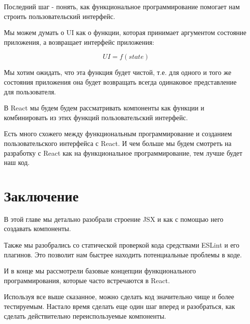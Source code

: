 Последний шаг - понять, как функциональное программирование помогает нам строить пользовательский интерфейс. 

Мы можем думать о UI как о функции, которая принимает аргументом состояние приложения, а возвращает интерфейс приложения:

$$
UI = f(state)
$$

Мы хотим ожидать, что эта функция будет чистой, т.е. для одного и того же состояния приложения она будет возвращать всегда одинаковое представление для пользователя.

В React мы будем будем рассматривать компоненты как функции и комбинировать из этих функций пользовательский интерфейс.

Есть много схожего между функциональным программирование и созданием пользовательского интерфейса с React. И чем больше мы будем смотреть на разработку с React как на функциональное программирование, тем лучше будет наш код.

\section{Заключение}

В этой главе мы детально разобрали строение JSX и как с помощью него создавать компоненты. 

Также мы разобрались со статической проверкой кода средствами ESLint и его плагинов. Это позволит нам быстрее находить потенциальные проблемы в коде.

И в конце мы рассмотрели базовые концепции функционального программирования, которые часто встречаются в React. 

Используя все выше сказанное, можно сделать код значительно чище и более тестируемым. Настало время сделать еще один шаг вперед и разобраться, как сделать действительно переиспользуемые компоненты.
